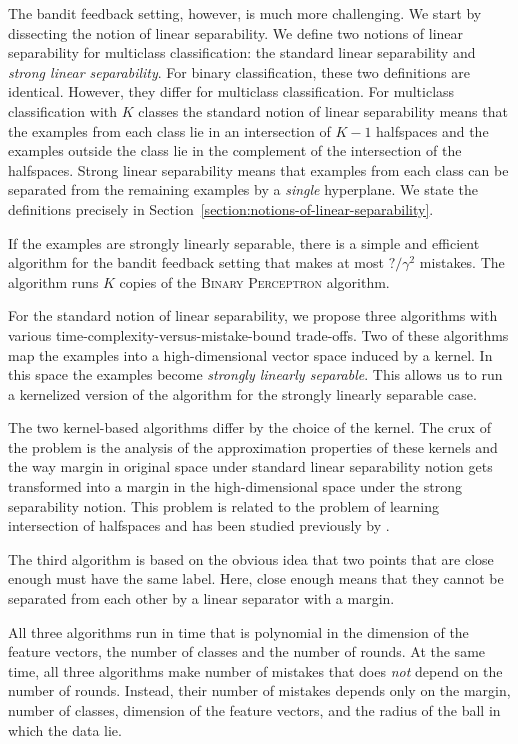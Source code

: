 \documentclass[12pt]{article}
\begin{document}
The bandit feedback setting, however, is much more challenging. We start by
dissecting the notion of linear separability. We define two notions of linear
separability for multiclass classification: the standard linear separability
and \emph{strong linear separability}. For binary classification, these two
definitions are identical. However, they differ for multiclass classification.
For multiclass classification with $K$ classes the standard notion of linear
separability means that the examples from each class lie in an intersection of
$K-1$ halfspaces and the examples outside the class lie in the complement of the
intersection of the halfspaces. Strong linear separability means that examples
from each class can be separated from the remaining examples by a \emph{single}
hyperplane. We state the definitions precisely
in Section~\ref{section:notions-of-linear-separability}.

If the examples are strongly linearly separable, there is a simple and efficient
algorithm for the bandit feedback setting that makes at most $?/\gamma^2$
mistakes. The algorithm runs $K$ copies of the \textsc{Binary Perceptron}
algorithm.

For the standard notion of linear separability, we propose three algorithms with
various time-complexity-versus-mistake-bound trade-offs. Two of these algorithms
map the examples into a high-dimensional vector space induced by a kernel. In
this space the examples become \emph{strongly linearly separable}. This allows
us to run a kernelized version of the algorithm for the strongly linearly
separable case.

The two kernel-based algorithms differ by the choice of the kernel. The crux of
the problem is the analysis of the approximation properties of these kernels and
the way margin in original space under standard linear separability notion gets
transformed into a margin in the high-dimensional space under the strong
separability notion. This problem is related to the problem of learning
intersection of halfspaces and has been studied previously by
\cite{Klivans-Servedio-2008}.

The third algorithm is based on the obvious idea that two points that are close
enough must have the same label. Here, close enough means that they cannot be
separated from each other by a linear separator with a margin.

All three algorithms run in time that is polynomial in the dimension of the
feature vectors, the number of classes and the number of rounds. At the same
time, all three algorithms make number of mistakes that does \emph{not} depend
on the number of rounds. Instead, their number of mistakes depends only on the
margin, number of classes, dimension of the feature vectors, and the radius of
the ball in which the data lie.
\end{document}
